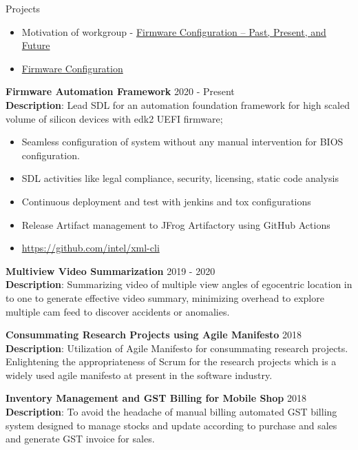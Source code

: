 \documentclass{resume} %
\begin{document}
\begin{rSection}{Projects}
\begin{itemize}
    \item Motivation of workgroup - \href{https://uefi.org/sites/default/files/resources/Firmware%20Configuration%20%E2%80%93%20Past%2C%20Present%2C%20and%20Future_Zimmer.pdf}{Firmware Configuration – Past, Present, and Future}
    \item \href{https://universalscalablefirmware.github.io/documentation/7_yaml_boot_configuration.html}{Firmware Configuration}
\end{itemize}

\textbf{Firmware Automation Framework}  \hfill {2020 - Present} \\
\textbf{Description}: Lead SDL for an automation foundation framework for high scaled volume of silicon devices with edk2 UEFI firmware;

\begin{itemize}
    \item Seamless configuration of system without any manual intervention for BIOS configuration.
    \item SDL activities like legal compliance, security, licensing, static code analysis
    \item Continuous deployment and test with jenkins and tox configurations
    \item Release Artifact management to JFrog Artifactory using GitHub Actions
    \item \href{https://github.com/intel/xml-cli}{https://github.com/intel/xml-cli}
\end{itemize}

\textbf{Multiview Video Summarization} \hfill {2019 - 2020}\\
\textbf{Description}: Summarizing video of multiple view angles of egocentric location in to one to generate effective video summary, minimizing overhead to explore multiple cam feed to discover accidents or anomalies.

\textbf{Consummating Research Projects using Agile Manifesto} \hfill {2018}\\
\textbf{Description}: Utilization of Agile Manifesto for consummating research projects. Enlightening the appropriateness of Scrum for the research projects which is a widely used agile manifesto at present in the software industry.

\textbf{Inventory Management and GST Billing for Mobile Shop} \hfill {2018}\\
\textbf{Description}: To avoid the headache of manual billing automated GST billing system designed to manage stocks and update according to purchase and sales and generate GST invoice for sales.


\end{rSection}
\end{document}
